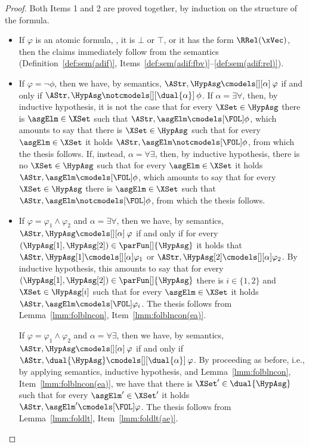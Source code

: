 \documentclass[authoryear]{elsarticle}
\begin{document}
\thmfolsemadq*
%
\begin{proof}
  Both Items 1 and 2 are proved together, by induction on the structure of the
  formula.

  \begin{itemize}
  \item If $\varphi$ is an atomic formula, \ie, it is $\bot$ or $\top$, or it
    has the form $\RRel(\xVec)$, then the claims immediately follow from the
    semantics (Definition~\ref{def:sem(adif)},
    Items~\ref{def:sem(adif:fbv)}--\ref{def:sem(adif:rel)}).

  \item If $\varphi = \neg \phi$, then we have, by semantics,
%
    $\AStr, \HypAsg \cmodels[][\alpha]\: \varphi$ if and only if $\AStr, \HypAsg
    \notcmodels[][\dual{\alpha}]\: \phi$.
    If $\alpha = \exists\forall$, then, by inductive hypothesis, it is not the
    case that for every $\XSet \in \HypAsg$ there is $\asgElm \in \XSet$ such
    that $\AStr, \asgElm \cmodels[\FOL] \phi$, which amounts to say that there
    is $\XSet \in \HypAsg$ such that for every $\asgElm \in \XSet$ it holds
    $\AStr, \asgElm \notcmodels[\FOL] \phi$, from which the thesis follows.
    If, instead, $\alpha = \forall\exists$, then, by inductive hypothesis, there
    is no $\XSet \in \HypAsg$ such that for every $\asgElm \in \XSet$ it holds
    $\AStr, \asgElm \cmodels[\FOL] \phi$, which amounts to say that for every
    $\XSet \in \HypAsg$ there is $\asgElm \in \XSet$ such that $\AStr, \asgElm
    \notcmodels[\FOL] \phi$, from which the thesis follows.

  \item If $\varphi = \varphi_1 \wedge\varphi_2$ and $\alpha = \exists\forall$,
    then we have, by semantics, $\AStr, \HypAsg \cmodels[][\alpha]\: \varphi$ if
    and only if for every $(\HypAsg[1], \HypAsg[2]) \in \parFun[]{\HypAsg}$
%
%
    it holds that $\AStr, \HypAsg[1] \cmodels[][\alpha] \varphi_{1}$ or $\AStr,
    \HypAsg[2] \cmodels[][\alpha] \varphi_{2}$.
    By inductive hypothesis, this amounts to say that for every $(\HypAsg[1],
    \HypAsg[2]) \in \parFun[]{\HypAsg}$ there is $i \in \{ 1,2 \}$ and $\XSet
    \in \HypAsg[i]$ such that for every $\asgElm \in \XSet$ it holds $\AStr,
    \asgElm \cmodels[\FOL]\varphi_{i}$.
    The thesis follows from Lemma~\ref{lmm:folblncon},
    Item~\ref{lmm:folblncon(ea)}.

    If $\varphi = \varphi_1 \wedge\varphi_2$ and $\alpha = \forall\exists$, then
    we have, by semantics, $\AStr, \HypAsg \cmodels[][\alpha]\: \varphi$ if and
    only if $\AStr, \dual{\HypAsg} \cmodels[][\dual{\alpha}]\: \varphi$.
    By proceeding as before, i.e., by applying semantics, inductive hypothesis,
    and Lemma~\ref{lmm:folblncon}, Item~\ref{lmm:folblncon(ea)}, we have that
    there is $\XSet' \in \dual{\HypAsg}$ such that for every $\asgElm' \in
    \XSet'$ it holds $\AStr, \asgElm' \cmodels[\FOL]\varphi$.
    The thesis follows from Lemma~\ref{lmm:foldlt}, Item~\ref{lmm:foldlt(ae)}.


\end{itemize}
\end{proof}
\end{document}
